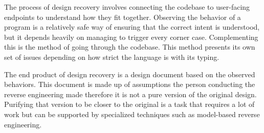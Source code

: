 The process of design recovery involves connecting the codebase to user-facing endpoints to understand how they fit together. Observing the behavior of a program is a relatively safe way of ensuring that the correct intent is understood, but it depends heavily on managing to trigger every corner case. Complementing this is the method of going through the codebase\cite{10.5555/2555229}. This method presents its own set of issues depending on how strict the language is with its typing. 

The end product of design recovery is a design document based on the observed behaviors. This document is made up of assumptions the person conducting the reverse engineering made therefore it is not a pure version of the original design. Purifying that version to be closer to the original is a task that requires a lot of work but can be supported by specialized techniques such as model-based reverse engineering\cite{DBLP:journals/computer/Biggerstaff89}.

